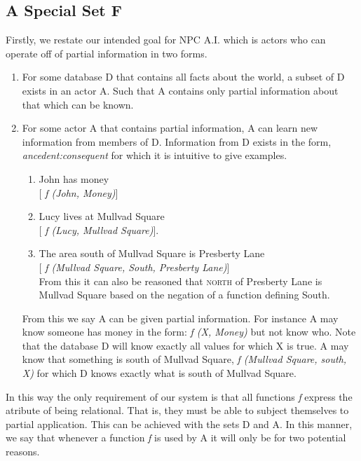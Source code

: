 \documentclass[11pt,twocolumn]{article}
\begin{document}
\subsection{A Special Set F}
Firstly, we restate our intended goal for NPC A.I. which is actors who can operate off of partial information in two forms.
\begin{enumerate}
\item For some database D that contains all facts about the world, a subset of D exists in an actor A.  Such that A contains only partial information about that which can be known.
\item For some actor A that contains partial information, A can learn new information from members of D.  Information from D exists in the form, \textit{ancedent:consequent} for which it is intuitive to give examples.
  \begin{enumerate}
  \item John has money \\\hspace*{\dotfill}[ \textit{f (John, Money)}]
  \item Lucy lives at Mullvad Square \\\hspace*{\dotfill}[ \textit{f (Lucy, Mullvad Square)}].
    \item The area south of Mullvad Square is Presberty Lane \\\hspace*{\dotfill}[ \textit{f (Mullvad Square, South, Presberty Lane)}] \\ From this it can also be reasoned that \textsc{north} of Presberty Lane is Mullvad Square based on the negation of a function defining South.
    \end{enumerate}
    From this we say A can be given partial information. For instance A may know someone has money in the form: \textit{f (X, Money)} but not know who.  Note that the database D will know exactly all values for which X is true.
    A may know that something is south of Mullvad Square, \textit{f (Mullvad Square, south, X)} for which D knows exactly what is south of Mullvad Square.
  \end{enumerate}
  In this way the only requirement of our system is that all functions \textit{f} express the atribute of being relational.  That is,  they must be able to subject themselves to partial application.  This can be achieved with the sets D and A. In this manner, we say that whenever a function \textit{f} is used by A it will only be for two potential reasons.
\end{document}
